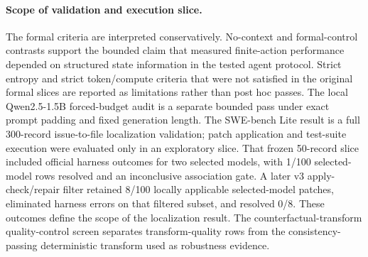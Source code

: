 \documentclass[11pt]{article}
\begin{document}
\paragraph{Scope of validation and execution slice.}
The formal criteria are interpreted conservatively. No-context and formal-control contrasts support the bounded claim that measured finite-action performance depended on structured state information in the tested agent protocol. Strict entropy and strict token/compute criteria that were not satisfied in the original formal slices are reported as limitations rather than post hoc passes. The local Qwen2.5-1.5B forced-budget audit is a separate bounded pass under exact prompt padding and fixed generation length. The SWE-bench Lite result is a full 300-record issue-to-file localization validation; patch application and test-suite execution were evaluated only in an exploratory slice. That frozen 50-record slice included official harness outcomes for two selected models, with 1/100 selected-model rows resolved and an inconclusive association gate. A later v3 apply-check/repair filter retained 8/100 locally applicable selected-model patches, eliminated harness errors on that filtered subset, and resolved 0/8. These outcomes define the scope of the localization result. The counterfactual-transform quality-control screen separates transform-quality rows from the consistency-passing deterministic transform used as robustness evidence.



\end{document}
